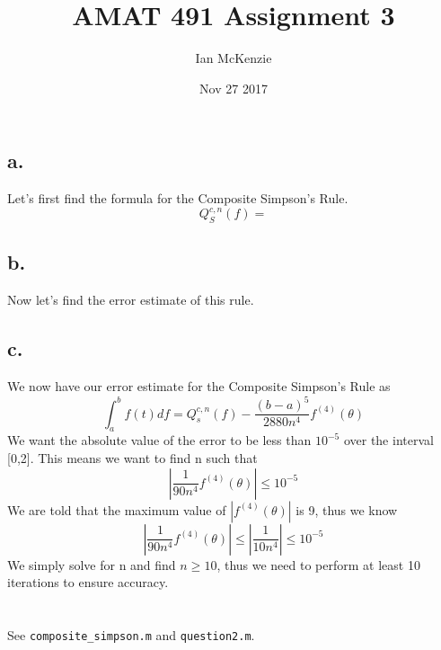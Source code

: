 \documentclass{article}
\title{AMAT 491 Assignment 3}
\date{Nov 27 2017}
\author{Ian McKenzie}
\begin{document}
\maketitle
\newpage
{}

\section{}
\subsection*{a.}
Let's first find the formula for the Composite Simpson's Rule.
\[Q_S^{c,n}(f)=\]
\subsection*{b.}
Now let's find the error estimate of this rule.
\subsection*{c.}
We now have our error estimate for the Composite Simpson's Rule as
\[\int_a^bf(t)df =  Q_s^{c,n}(f) - \frac{(b-a)^5}{2880n^4}f^{(4)}(\theta)\]
We want the absolute value of the error to be less than \(10^{-5}\)
over the interval [0,2]. This means we want to find n such that
\[\left|\frac{1}{90n^4}f^{(4)}(\theta)\right| \leq 10^{-5}\]
We are told that the maximum value of \(|f^{(4)}(\theta)|\) is 9, thus
we know
\[\left|\frac{1}{90n^4}f^{(4)}(\theta)\right|
\leq \left|\frac{1}{10n^4}\right| \leq 10^{-5}\]
We simply solve for n and find \(n\geq10\), thus we need to
perform at least 10 iterations to ensure accuracy. 



\section{}
See \texttt{composite\_simpson.m} and \texttt{question2.m}.

\end{document}
